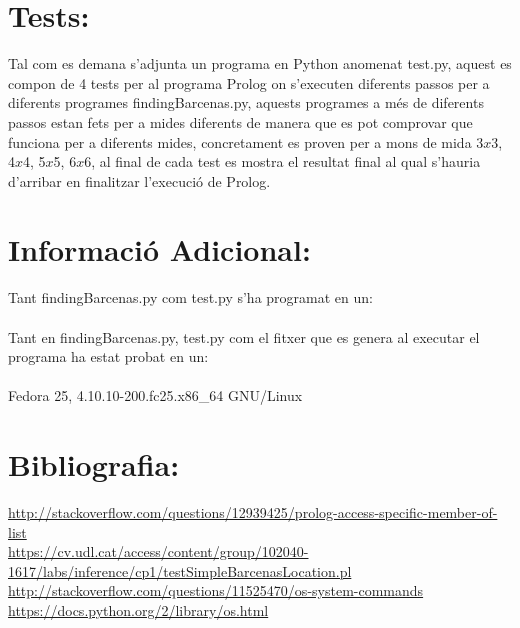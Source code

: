 \documentclass[11pt]{article}
\begin{document}
\section{Tests:}
Tal com es demana s'adjunta un programa en Python anomenat test.py, aquest es compon de 4 tests per al programa Prolog on s'executen diferents passos per a diferents programes findingBarcenas.py, aquests programes a més de diferents passos estan fets per a mides diferents de manera que es pot comprovar que funciona per a diferents mides, concretament es proven per a mons de mida 3$x$3, 4$x$4, 5$x$5, 6$x$6, al final de cada test es mostra el resultat final al qual s'hauria d'arribar en finalitzar l'execució de Prolog.
\section{Informació Adicional:}
Tant findingBarcenas.py com test.py s'ha programat en un:\\\\

Tant en findingBarcenas.py, test.py com el fitxer que es genera al executar el programa ha estat probat en un:\\\\

Fedora 25, 4.10.10-200.fc25.x86_64 GNU/Linux\\


\section{Bibliografia:} 
\url{http://stackoverflow.com/questions/12939425/prolog-access-specific-member-of-list}\\
\url{https://cv.udl.cat/access/content/group/102040-1617/labs/inference/cp1/testSimpleBarcenasLocation.pl}\\
\url{http://stackoverflow.com/questions/11525470/os-system-commands}\\
\url{https://docs.python.org/2/library/os.html}
\end{document}
